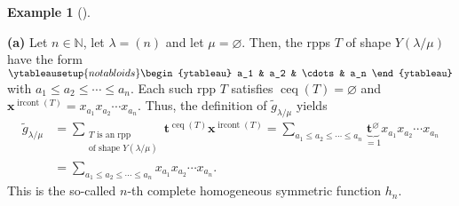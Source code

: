 \documentclass[numbers=enddot,12pt,final,onecolumn,notitlepage]{scrartcl}%
\theoremstyle{definition}
\newtheorem{exmp}[theo]{Example}
\newenvironment{example}[1][]
{\begin{exmp}[#1]\begin{leftbar}}
{\end{leftbar}\end{exmp}}
\let\sumnonlimits\sum
\renewcommand{\sum}{\sumnonlimits\limits}
\begin{document}
\begin{example}
\label{exa.gtilde.1}\textbf{(a)} Let $n\in\mathbb{N}$, let $\lambda=\left(
n\right)  $ and let $\mu=\varnothing$. Then, the rpps $T$ of shape $Y\left(
\lambda/\mu\right)  $ have the form $%
\ytableausetup{notabloids}
\begin{ytableau}
a_1 & a_2 & \cdots& a_n
\end{ytableau}%
$ with $a_{1}\leq a_{2}\leq\cdots\leq a_{n}$. Each such rpp $T$ satisfies
$\operatorname*{ceq}\left(  T\right)  =\varnothing$ and $\mathbf{x}%
^{\operatorname*{ircont}\left(  T\right)  }=x_{a_{1}}x_{a_{2}}\cdots x_{a_{n}%
}$. Thus, the definition of $\widetilde{g}_{\lambda/\mu}$ yields
\begin{align*}
\widetilde{g}_{\lambda/\mu}  &  =\sum_{\substack{T\text{ is an rpp}\\\text{of
shape }Y\left(  \lambda/\mu\right)  }}\mathbf{t}^{\operatorname*{ceq}\left(
T\right)  }\mathbf{x}^{\operatorname*{ircont}\left(  T\right)  }=\sum
_{a_{1}\leq a_{2}\leq\cdots\leq a_{n}}\underbrace{\mathbf{t}^{\varnothing}%
}_{=1}x_{a_{1}}x_{a_{2}}\cdots x_{a_{n}}\\
&  =\sum_{a_{1}\leq a_{2}\leq\cdots\leq a_{n}}x_{a_{1}}x_{a_{2}}\cdots
x_{a_{n}}.
\end{align*}
This is the so-called $n$-th complete homogeneous symmetric function $h_{n}$.


\end{example}
\end{document}
